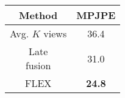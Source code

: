 \begin{center}
\begin{tabular}{|c|c|} \hline

\textbf{Method} & \textbf{MPJPE } \\
\hline
\makecell{Avg. \\ $K$ views} & 36.4 \\
\hline
\makecell{Late \\ fusion} & 31.0 \\
\hline
FLEX & \textbf{24.8} \\
\hline
\end{tabular}
\end{center}
\label{tab:ablation}
